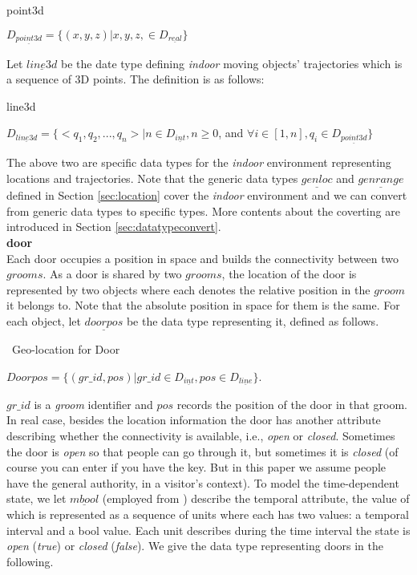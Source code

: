\begin{Statement}
\label{3dpoint}
point3d  

$D_{\underline{point3d}}=\{(x,y,z)|x,y,z,\in D_{\underline{real}}\}$

\end{Statement}

Let $\underline{line3d}$ be the date type defining \textit{indoor} moving objects' trajectories which is a sequence of 3D points. The definition is as follows:

\begin{Statement}
\label{3dline}
line3d 

$D_{\underline{line3d}}=\{<q_1,q_2,...,q_n>| n \in D_{\underline{int}}, n \geq 0$, and $\forall i \in [1,n], q_i \in D_{\underline{point3d}}\}$

\end{Statement} 

The above two are specific data types for the \textit{indoor} environment representing locations and trajectories. Note that the generic data types $\underline{genloc}$ and $\underline{genrange}$ defined in Section \ref{sec:location} cover the \textit{indoor} environment and we can convert from generic data types to specific types. More contents about the coverting are introduced in Section \ref{sec:datatypeconvert}. \\

\textbf{door} \\

Each door occupies a position in space and builds the connectivity between
two $grooms$. As a door is shared by two $grooms$, the location of the door is represented by two 
objects where each denotes the relative position in the $groom$ it belongs to. Note that the absolute 
position in space for them is the same. For each object, let $\underline{doorpos}$ be 
the data type representing it, defined as follows. 

\begin{Statement}
\label{geodoor}
\ Geo-location for Door  

$Doorpos=\{(gr\_id, pos)|gr\_id \in D_{\underline{int}}, pos \in D_{\underline{line}} \}$.

\end{Statement}

$gr\_id$ is a \textit{groom} identifier and $pos$ records the position of the door in 
that groom. In real case, besides the location information the door has another attribute describing whether the connectivity is available, i.e., \textit{open} or \textit{closed}. Sometimes the door is \textit{open} so that people can go through it, but sometimes it is \textit{closed}
(of course you can enter if you have the key. But in this paper we assume people have the 
general authority, in a visitor's context). To model the time-dependent state, we let $\underline{mbool}$ (employed from \cite{FG+00}) describe the temporal attribute, the value of which is represented as 
a sequence of units where each has two values: a temporal interval and a bool value. 
Each unit describes during the time interval the state is \textit{open} (\textit{true}) or \textit{closed} (\textit{false}). We give the data type representing doors in the following. 


